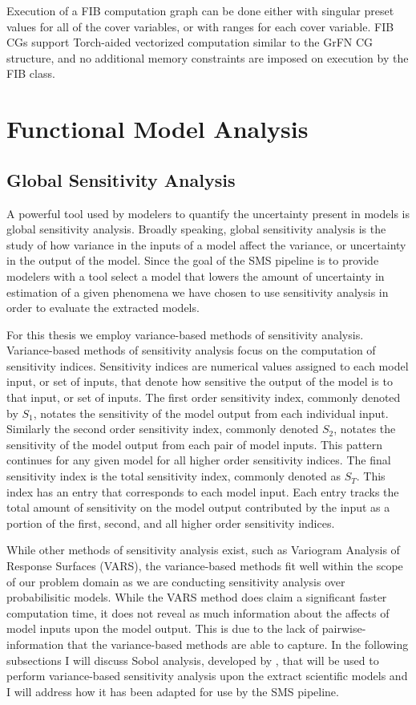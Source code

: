 Execution of a FIB computation graph can be done either with singular preset values for all of the cover variables, or with ranges for each cover variable.
FIB CGs support Torch-aided vectorized computation similar to the GrFN CG structure, and no additional memory constraints are imposed on execution by the FIB class.

\section{Functional Model Analysis\label{sec:functional_analysis}}

\subsection{Global Sensitivity Analysis\label{sec:sens_analysis}}
A powerful tool used by modelers to quantify the uncertainty present in models is global sensitivity analysis. Broadly speaking, global sensitivity analysis is the study of how variance in the inputs of a model affect the variance, or uncertainty in the output of the model. Since the goal of the SMS pipeline is to provide modelers with a tool select a model that lowers the amount of uncertainty in estimation of a given phenomena we have chosen to use sensitivity analysis in order to evaluate the extracted models.

For this thesis we employ variance-based methods of sensitivity analysis.
Variance-based methods of sensitivity analysis focus on the computation of sensitivity indices. Sensitivity indices are numerical values assigned to each model input, or set of inputs, that denote how sensitive the output of the model is to that input, or set of inputs. The first order sensitivity index, commonly denoted by $S_1$, notates the sensitivity of the model output from each individual input. Similarly the second order sensitivity index, commonly denoted $S_2$, notates the sensitivity of the model output from each pair of model inputs. This pattern continues for any given model for all higher order sensitivity indices.
The final sensitivity index is the total sensitivity index, commonly denoted as $S_T$. This index has an entry that corresponds to each model input. Each entry tracks the total amount of sensitivity on the model output contributed by the input as a portion of the first, second, and all higher order sensitivity indices.

While other methods of sensitivity analysis exist, such as Variogram Analysis of Response Surfaces (VARS), the variance-based methods fit well within the scope of our problem domain as we are conducting sensitivity analysis over probabilisitic models.
While the VARS method does claim a significant faster computation time, it does not reveal as much information about the affects of model inputs upon the model output.
This is due to the lack of pairwise-information that the variance-based methods are able to capture.
In the following subsections I will discuss Sobol analysis, developed by \citet{sobol2001globalSA}, that will be used to perform variance-based sensitivity analysis upon the extract scientific models and I will address how it has been adapted for use by the SMS pipeline.

